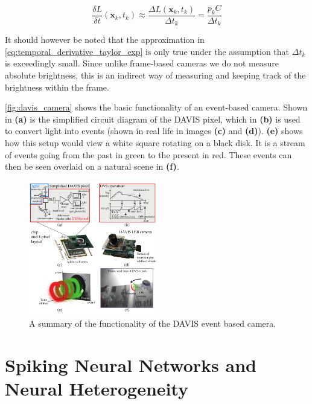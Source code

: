 \begin{equation}
      \frac{\delta L}{\delta t}(\boldsymbol{\mathbf{x}}_k, t_k) \approx \frac{\Delta L(\boldsymbol{\mathbf{x}}_k, t_k)}{\Delta t_k} = \frac{p_k C}{\Delta t_k}
      \label{eq:temporal_derivative}
\end{equation}

It should however be noted that the approximation in \autoref{eq:temporal_derivative_taylor_exp} is only true under the assumption that $ \Delta t_k $ is exceedingly small. Since unlike frame-based cameras we do not measure absolute brightness, this is an indirect way of measuring and keeping track of the brightness within the frame.

\autoref{fig:davis_camera} shows the basic functionality of an event-based camera. Shown in \textbf{(a)} is the simplified circuit diagram of the DAVIS pixel, which in \textbf{(b)} is used to convert light into events (shown in real life in images \textbf{(c)} and \textbf{(d)}). \textbf{(e)} shows how this setup would view a white square rotating on a black disk. It is a stream of events going from the past in green to the present in red. These events can then be seen overlaid on a natural scene in \textbf{(f)}.

\begin{figure}[htb]
      \centering
      \includegraphics[width=0.5\textwidth]{background/images/davis_camera.png}
      \caption{A summary of the functionality of the DAVIS event based camera\cite{EventBasedVisionASurvery}.}
      \label{fig:davis_camera}
\end{figure}

\section{Spiking Neural Networks and Neural Heterogeneity} \label{ssec:snn_and_heterogeneity}

